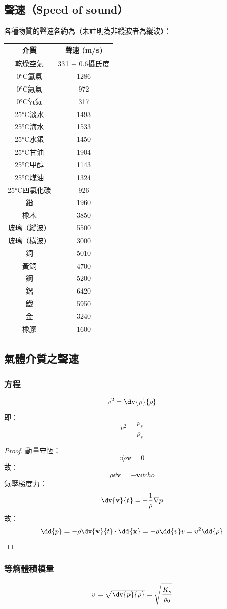 \documentclass[a4paper,12pt]{report}
\begin{document}
\subsection{聲速（Speed of sound）}
各種物質的聲速各約為（未註明為非縱波者為縱波）：
\begin{longtable}[c]{|c|c|}
\hline
介質 & 聲速 (m/s)\\\hline\endhead
乾燥空氣 & 331 + 0.6攝氏度\\\hline
0°C氫氣 & 1286\\\hline
0°C氦氣 & 972\\\hline
0°C氧氣 & 317\\\hline
25°C淡水 & 1493\\\hline
25°C海水 & 1533\\\hline
25°C水銀 & 1450\\\hline
25°C甘油 & 1904\\\hline
25°C甲醇 & 1143\\\hline
25°C煤油 & 1324\\\hline
25°C四氯化碳 & 926\\\hline
鉛 & 1960\\\hline
橡木 & 3850\\\hline
玻璃（縱波） & 5500\\\hline
玻璃（橫波） & 3000\\\hline
銅 & 5010\\\hline
黃銅 & 4700\\\hline
鋼 & 5200\\\hline
鋁 & 6420\\\hline
鐵 & 5950\\\hline
金 & 3240\\\hline
橡膠 & 1600\\\hline
\end{longtable}\FB
\subsection {氣體介質之聲速}
\subsubsection {方程}
\[v^2 = \dv{p}{\rho}\]
即：
\[v^2=\frac{p_s}{\rho_s}\]
\begin{proof}
動量守恆：
\[\dd{\rho \mathbf{v}} = 0\]
故：
\[\rho\dd{\mathbf{v}}=-\mathbf{v}\dd{rho}\]
氣壓梯度力：
\[\dv{\mathbf{v}}{t} = -\frac{1}{\rho}\nabla p\]
故：
\[\dd{p}=-\rho\dv{\mathbf{v}}{t}\cdot\dd{\mathbf{x}}=-\rho\dd{v}v=v^2\dd{\rho}\]
\end{proof}
\subsubsection {等熵體積模量}
\[v = \sqrt{\dv{p}{\rho}}=\sqrt{\frac{K_s}{\rho_0}}\]
\end{document}
